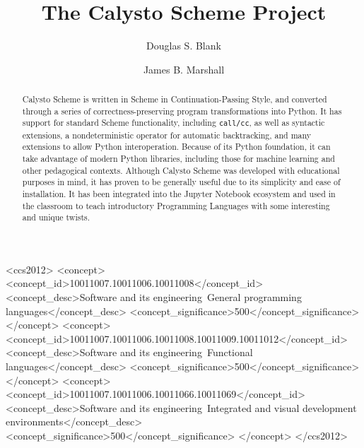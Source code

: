 \documentclass[acmsmall,screen,authorversion]{acmart}
\begin{document}
\title[Calysto Scheme]{The Calysto Scheme Project}

\author{Douglas S. Blank}

\author{James B. Marshall}

\renewcommand{\shortauthors}{D. S. Blank and J. B. Marshall}

\begin{abstract}
Calysto Scheme is written in Scheme in Continuation-Passing Style, and
converted through a series of correctness-preserving program transformations
into Python. It has support for standard Scheme functionality, including
\texttt{call/cc}, as well as syntactic extensions, a nondeterministic operator
for automatic backtracking, and many extensions to allow Python
interoperation. Because of its Python foundation, it can take advantage of
modern Python libraries, including those for machine learning and other
pedagogical contexts. Although Calysto Scheme was developed with educational
purposes in mind, it has proven to be generally useful due to its simplicity
and ease of installation. It has been integrated into the Jupyter Notebook
ecosystem and used in the classroom to teach introductory Programming Languages
with some interesting and unique twists.
\end{abstract}

\begin{CCSXML}
<ccs2012>
<concept>
<concept_id>10011007.10011006.10011008</concept_id>
<concept_desc>Software and its engineering~General programming languages</concept_desc>
<concept_significance>500</concept_significance>
</concept>
<concept>
<concept_id>10011007.10011006.10011008.10011009.10011012</concept_id>
<concept_desc>Software and its engineering~Functional languages</concept_desc>
<concept_significance>500</concept_significance>
</concept>
<concept>
<concept_id>10011007.10011006.10011066.10011069</concept_id>
<concept_desc>Software and its engineering~Integrated and visual development environments</concept_desc>
<concept_significance>500</concept_significance>
</concept>
</ccs2012>
\end{CCSXML}
\end{document}

